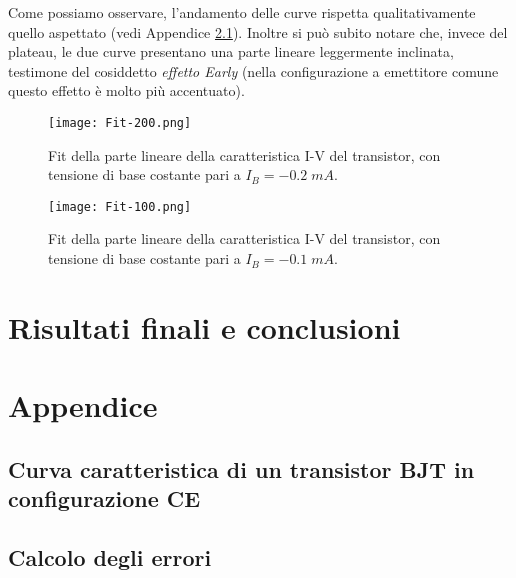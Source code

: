 \documentclass[a4paper, 11pt]{article}
\begin{document}
Come possiamo osservare, l'andamento delle curve rispetta qualitativamente quello aspettato (vedi Appendice \ref{sec:curva-caratteristica-transistor}). Inoltre si può subito notare che, invece del plateau, le due curve presentano una parte lineare leggermente inclinata, testimone del cosiddetto \textit{effetto Early} (nella configurazione a emettitore comune questo effetto è molto più accentuato). 

\begin{figure}[!htb]
    \centering
    \texttt{[image: Fit-200.png]}
    \caption{Fit della parte lineare della caratteristica I-V del transistor, con tensione di base costante pari a $I_B = -0.2 \;mA $.}
    \label{fig:fit-200}
\end{figure}

\begin{figure}[!htb]
    \centering
    \texttt{[image: Fit-100.png]}
    \caption{Fit della parte lineare della caratteristica I-V del transistor, con tensione di base costante pari a $I_B = -0.1 \;mA $.}
    \label{fig:fit-100}
\end{figure}


 
\section{Risultati finali e conclusioni}

\newpage
\section{Appendice}

\subsection{Curva caratteristica di un transistor BJT in configurazione CE} \label{sec:curva-caratteristica-transistor}


\subsection{Calcolo degli errori} \label{sec:errori}
\end{document}
